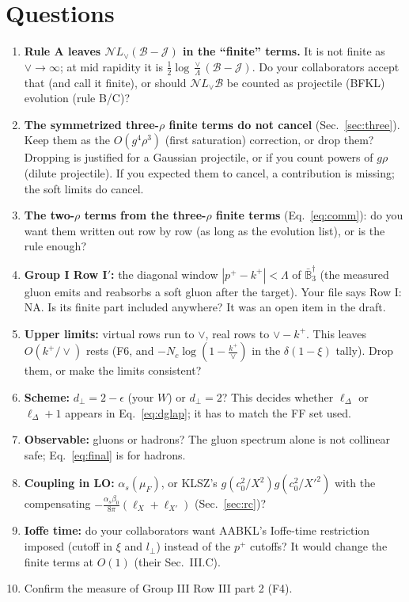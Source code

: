 \documentclass[10pt]{article}
\numberwithin{equation}{section}
\newcommand{\Lv}{L_{\vee}}
\newcommand{\JJ}{\mathcal J}
\newcommand{\BB}{\mathcal B}
\newcommand{\NN}{\mathcal N}
\begin{document}
\section{Questions}\label{sec:questions}
\begin{enumerate}
\item[\textbf{Q1}] \textbf{Rule A leaves $\NN\Lv(\BB-\JJ)$ in the ``finite'' terms.} It is not finite as $\vee\to\infty$; at mid rapidity it is $\frac12\log\frac\vee\Lambda(\BB-\JJ)$. Do your collaborators accept that (and call it finite), or should $\NN\Lv\BB$ be counted as projectile (BFKL) evolution (rule B/C)?
\item[\textbf{Q2}] \textbf{The symmetrized three-$\rho$ finite terms do not cancel} (Sec.~\ref{sec:three}). Keep them as the $O(g^4\rho^3)$ (first saturation) correction, or drop them? Dropping is justified for a Gaussian projectile, or if you count powers of $g\rho$ (dilute projectile). If you expected them to cancel, a contribution is missing; the soft limits do cancel.
\item[\textbf{Q3}] \textbf{The two-$\rho$ terms from the three-$\rho$ finite terms} (Eq.~\eqref{eq:comm}): do you want them written out row by row (as long as the evolution list), or is the rule enough?
\item[\textbf{Q4}] \textbf{Group I Row I$'$:} the diagonal window $|p^+-k^+|<\Lambda$ of $\bar{\mathbb B}_3^\dagger$ (the measured gluon emits and reabsorbs a soft gluon after the target). Your file says Row I: NA. Is its finite part included anywhere? It was an open item in the draft.
\item[\textbf{Q5}] \textbf{Upper limits:} virtual rows run to $\vee$, real rows to $\vee-k^+$. This leaves $O(k^+/\vee)$ rests (F6, and $-N_c\log(1-\frac{k^+}{\vee})$ in the $\delta(1-\xi)$ tally). Drop them, or make the limits consistent?
\item[\textbf{Q6}] \textbf{Scheme:} $d_\perp=2-\epsilon$ (your $W$) or $d_\perp=2$? This decides whether $\ell_\Delta$ or $\ell_\Delta+1$ appears in Eq.~\eqref{eq:dglap}; it has to match the FF set used.
\item[\textbf{Q7}] \textbf{Observable:} gluons or hadrons? The gluon spectrum alone is not collinear safe; Eq.~\eqref{eq:final} is for hadrons.
\item[\textbf{Q8}] \textbf{Coupling in LO:} $\alpha_s(\mu_F)$, or KLSZ's $g(c_0^2/X^2)g(c_0^2/X'^2)$ with the compensating $-\frac{\alpha_s\beta_0}{8\pi}(\ell_X+\ell_{X'})$ (Sec.~\ref{sec:rc})?
\item[\textbf{Q9}] \textbf{Ioffe time:} do your collaborators want AABKL's Ioffe-time restriction imposed (cutoff in $\xi$ and $l_\perp$) instead of the $p^+$ cutoffs? It would change the finite terms at $O(1)$ (their Sec.~III.C).
\item[\textbf{Q10}] Confirm the measure of Group III Row III part 2 (F4).
\end{enumerate}
\end{document}
